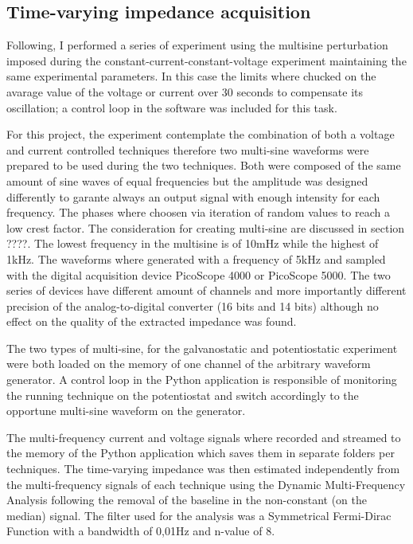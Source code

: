 \subsection{Time-varying impedance acquisition}

Following, I performed a series of experiment using the multisine perturbation imposed during the constant-current-constant-voltage experiment maintaining the same experimental parameters. In this case the limits where chucked on the avarage value of the voltage or current over 30 seconds to compensate its oscillation; a control loop in the software was included for this task.

For this project, the experiment contemplate the combination of both a voltage and current controlled techniques therefore two multi-sine waveforms were prepared to be used during the two techniques. Both were composed of the same amount of sine waves of equal frequencies but the amplitude was designed differently to garante always an output signal with enough intensity for each frequency. The phases where choosen via iteration of random values to reach a low crest factor. The consideration for creating multi-sine are discussed in section ????. The lowest frequency in the multisine is of 10mHz while the highest of 1kHz. The waveforms where generated with a frequency of 5kHz and sampled with the digital acquisition device PicoScope 4000 or PicoScope 5000. The two series of devices have different amount of channels and more importantly different precision of the analog-to-digital converter (16 bits and 14 bits) although no effect on the quality of the extracted impedance was found. 

The two types of multi-sine, for the galvanostatic and potentiostatic experiment were both loaded on the memory of one channel of the arbitrary waveform generator. A control loop in the Python application is responsible of monitoring the running technique on the potentiostat and switch accordingly to the opportune multi-sine waveform on the generator.

The multi-frequency current and voltage signals where recorded and streamed to the memory of the Python application which saves them in separate folders per techniques. The time-varying impedance was then estimated independently from the multi-frequency signals of each technique using the Dynamic Multi-Frequency Analysis following the removal of the baseline in the non-constant (on the median) signal. The filter used for the analysis was a Symmetrical Fermi-Dirac Function with a bandwidth of 0,01Hz and n-value of 8. 

